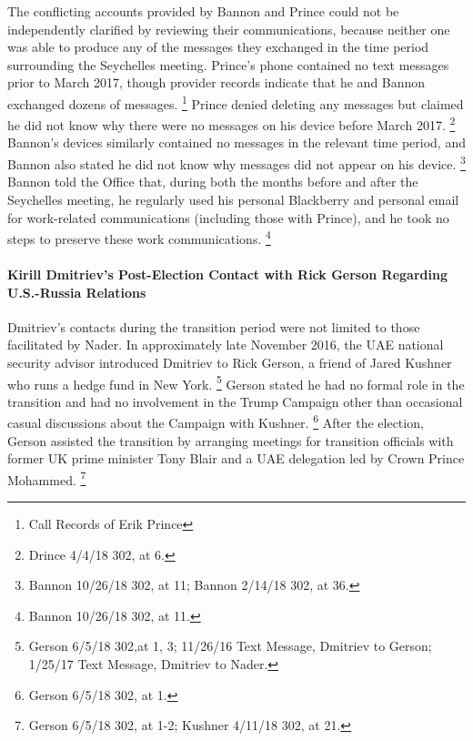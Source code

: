 The conflicting accounts provided by Bannon and Prince could not be independently clarified by reviewing their communications, because neither one was able to produce any of the messages they exchanged in the time period surrounding the Seychelles meeting.
Prince's phone contained no text messages prior to March 2017, though provider records indicate that he and Bannon exchanged dozens of messages.%
\footnote{Call Records of Erik Prince }
Prince denied deleting any messages but claimed he did not know why there were no messages on his device before March 2017.%
\footnote{Drince 4/4/18 302, at 6.}
Bannon's devices similarly contained no messages in the relevant time period, and Bannon also stated he did not know why messages did not appear on his device.%
\footnote{Bannon 10/26/18 302, at 11;
Bannon 2/14/18 302, at 36.}
Bannon told the Office that, during both the months before and after the Seychelles meeting, he regularly used his personal Blackberry and personal email for work-related communications (including those with Prince), and he took no steps to preserve these work communications.%
\footnote{Bannon 10/26/18 302, at 11.}

\paragraph{Kirill Dmitriev's Post-Election Contact with Rick Gerson Regarding U.S.-Russia Relations}

Dmitriev's contacts during the transition period were not limited to those facilitated by Nader.
In approximately late November 2016, the UAE national security advisor introduced Dmitriev to Rick Gerson, a friend of Jared Kushner who runs a hedge fund in New York.%
\footnote{Gerson 6/5/18 302,at 1, 3;
11/26/16 Text Message, Dmitriev to Gerson;
1/25/17 Text Message, Dmitriev to Nader.}
Gerson stated he had no formal role in the transition and had no involvement in the Trump Campaign other than occasional casual discussions about the Campaign with Kushner.%
\footnote{Gerson 6/5/18 302, at 1.}
After the election, Gerson assisted the transition by arranging meetings for transition officials with former UK prime minister Tony Blair and a UAE delegation led by Crown Prince Mohammed.%
\footnote{Gerson 6/5/18 302, at 1-2;
Kushner 4/11/18 302, at 21.}

